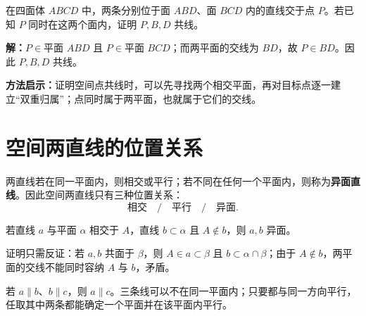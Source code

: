 \begin{examplebox}
  在四面体 $ABCD$ 中，两条分别位于面 $ABD$、面 $BCD$ 内的直线交于点 $P$。若已知 $P$ 同时在这两个面内，证明 $P,B,D$ 共线。

  \begin{center}
  \end{center}

  \textbf{解：}$P\in\text{平面 }ABD$ 且 $P\in\text{平面 }BCD$；而两平面的交线为 $BD$，故 $P\in BD$。因此 $P,B,D$ 共线。

  \textbf{方法启示：}证明空间点共线时，可以先寻找两个相交平面，再对目标点逐一建立“双重归属”；点同时属于两平面，也就属于它们的交线。
\end{examplebox}

\section{空间两直线的位置关系}

两直线若在同一平面内，则相交或平行；若不同在任何一个平面内，则称为\textbf{异面直线}。因此空间两直线只有三种位置关系：
\[
  \text{相交}\quad/\quad\text{平行}\quad/\quad\text{异面}.
\]

\begin{lawbox}[异面直线的判定]
  若直线 $a$ 与平面 $\alpha$ 相交于 $A$，直线 $b\subset\alpha$ 且 $A\notin b$，则 $a,b$ 异面。
\end{lawbox}

证明只需反证：若 $a,b$ 共面于 $\beta$，则 $A\in a\subset\beta$ 且 $b\subset\alpha\cap\beta$；由于 $A\notin b$，两平面的交线不能同时容纳 $A$ 与 $b$，矛盾。

\begin{corollarybox}[空间平行线的传递性]
  若 $a\parallel b$、$b\parallel c$，则 $a\parallel c$。三条线可以不在同一平面内；只要都与同一方向平行，任取其中两条都能确定一个平面并在该平面内平行。
\end{corollarybox}

